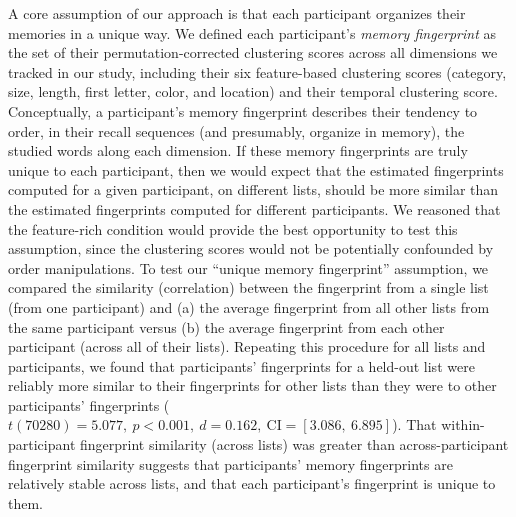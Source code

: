 \documentclass[11pt]{article}
\newcommand{\abbreviations}{S1}
\begin{document}
A core assumption of our approach is that each participant organizes their
memories in a unique way. We defined each participant's \textit{memory
fingerprint} as the set of their permutation-corrected clustering scores across
all dimensions we tracked in our study, including their six feature-based
clustering scores (category, size, length, first letter, color, and location)
and their temporal clustering score. Conceptually, a participant's memory
fingerprint describes their tendency to order, in their recall sequences (and
presumably, organize in memory), the studied words along each dimension. If
these memory fingerprints are truly unique to each participant, then we would
expect that the estimated fingerprints computed for a given participant, on
different lists, should be more similar than the estimated fingerprints
computed for different participants. We reasoned that the feature-rich
condition would provide the best opportunity to test this assumption, since the
clustering scores would not be potentially confounded by order manipulations.
To test our ``unique memory fingerprint'' assumption, we compared the
similarity (correlation) between the fingerprint from a single list (from one
participant) and (a) the average fingerprint from all other lists from the same
participant versus (b) the average fingerprint from each other participant
(across all of their lists). Repeating this procedure for all lists and
participants, we found that participants' fingerprints for a held-out list were
reliably more similar to their fingerprints for other lists than they were to
other participants' fingerprints ($t(70280) = 5.077,~p < 0.001,~d =
0.162,~\mathrm{CI} = [3.086,~6.895]$). That within-participant fingerprint
similarity (across lists) was greater than across-participant fingerprint
similarity suggests that participants' memory fingerprints are relatively
stable across lists, and that each participant's fingerprint is unique to them.

\begin{table}[tp]
\centering
\tiny


\caption{\textbf{Comparing memory for early versus late lists in the
feature-rich condition.} The paired $t$-tests reported in the table were
carried out within-participant. Abbreviations used in this table are defined in
Table~\abbreviations.}

\label{tab:early-vs-late-feature-rich} 
\end{table}

\begin{table}[tp]
\centering
\tiny


\caption{\textbf{Comparing memory for early versus late lists in the reduced
condition.} The paired $t$-tests reported in the table were carried out
within-participant. Abbreviations used in this table are defined in
Table~\abbreviations.}

\label{tab:early-vs-late-reduced}
\end{table}
\end{document}
